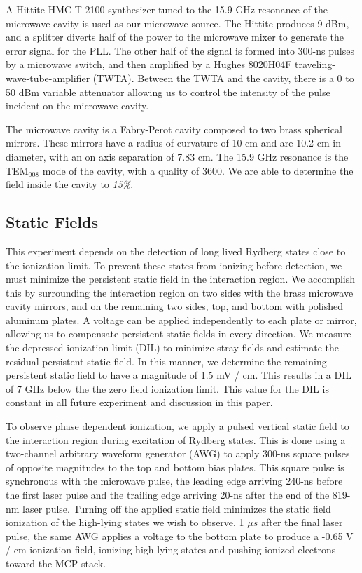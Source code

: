 \documentclass[aps,pra,preprint,groupedaddress]{revtex4-1}
\begin{document}
A Hittite HMC T-2100 synthesizer tuned to the 15.9-GHz resonance of the microwave cavity is used as our microwave source. The Hittite produces 9 dBm, and a splitter diverts half of the power to the microwave mixer to generate the error signal for the PLL. The other half of the signal is formed into 300-ns pulses by a microwave switch, and then amplified by a Hughes 8020H04F traveling-wave-tube-amplifier (TWTA). Between the TWTA and the cavity, there is a 0 to 50 dBm variable attenuator allowing us to control the intensity of the pulse incident on the microwave cavity.

The microwave cavity is a Fabry-Perot cavity composed to two brass spherical mirrors. These mirrors have a radius of curvature of 10 cm and are 10.2 cm in diameter, with an on axis separation of 7.83 cm. The 15.9 GHz resonance is the TEM$_{008}$ mode of the cavity, with a quality of 3600. We are able to determine the field inside the cavity to \emph{15\%}.

\subsection{\label{fields} Static Fields}

This experiment depends on the detection of long lived Rydberg states close to the ionization limit. To prevent these states from ionizing before detection, we must minimize the persistent static field in the interaction region. We accomplish this by surrounding the interaction region on two sides with the brass microwave cavity mirrors, and on the remaining two sides, top, and bottom with polished aluminum plates. A voltage can be applied independently to each plate or mirror, allowing us to compensate persistent static fields in every direction. We measure the depressed ionization limit (DIL) to minimize stray fields and estimate the residual persistent static field. In this manner, we determine the remaining persistent static field to have a magnitude of 1.5 mV / cm. This results in a DIL of 7 GHz below the the zero field ionization limit. This value for the DIL is constant in all future experiment and discussion in this paper.

To observe phase dependent ionization, we apply a pulsed vertical static field to the interaction region during excitation of Rydberg states. This is done using a two-channel arbitrary waveform generator (AWG) to apply 300-ns square pulses of opposite magnitudes to the top and bottom bias plates. This square pulse is synchronous with the microwave pulse, the leading edge arriving 240-ns before the first laser pulse and the trailing edge arriving 20-ns after the end of the 819-nm laser pulse. Turning off the applied static field minimizes the static field ionization of the high-lying states we wish to observe. 1 $\mu s$ after the final laser pulse, the same AWG applies a voltage to the bottom plate to produce a -0.65 V / cm ionization field, ionizing high-lying states and pushing ionized electrons toward the MCP stack.
\end{document}
